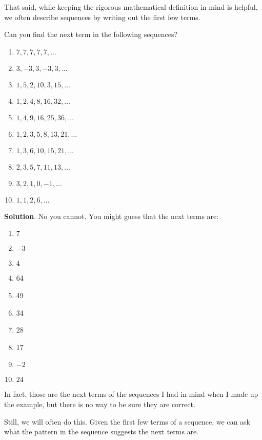 \documentclass[11pt,]{book}
\theoremstyle{ptxplainnotitle}
\theoremstyle{ptxplaintitle}
\theoremstyle{ptxdefinitionnotitle}
\theoremstyle{ptxdefinitiontitle}
\theoremstyle{ptxdefinitionnotitle}
\theoremstyle{ptxdefinitiontitle}
\theoremstyle{ptxdefinitionnotitle}
\theoremstyle{ptxdefinitiontitle}
\theoremstyle{ptxdefinitiontitlenonumber}
\theoremstyle{ptxdefinitiontitlenonumber}
\numberwithin{equation}{chapter}
\begin{document}
\par
\hypertarget{p-27}{}%
That said, while keeping the rigorous mathematical definition in mind is helpful, we often describe sequences by writing out the first few terms.%
\begin{example}\label{example-1}
\hypertarget{p-28}{}%
Can you find the next term in the following sequences?%
\par
\hypertarget{p-29}{}%
\leavevmode%
\begin{enumerate}
\item\hypertarget{li-4}{}\(7,7,7,7,7, \ldots\)%
\item\hypertarget{li-5}{}\(3, -3, 3, -3, 3, \ldots\)%
\item\hypertarget{li-6}{}\(1, 5, 2, 10, 3, 15, \ldots\)%
\item\hypertarget{li-7}{}\(1, 2, 4, 8, 16, 32, \ldots\)%
\item\hypertarget{li-8}{}\(1, 4, 9, 16, 25, 36, \ldots\)%
\item\hypertarget{li-9}{}\(1, 2, 3, 5, 8, 13, 21, \ldots\)%
\item\hypertarget{li-10}{}\(1, 3, 6, 10, 15, 21, \ldots\)%
\item\hypertarget{li-11}{}\(2, 3, 5, 7, 11, 13, \ldots\)%
\item\hypertarget{li-12}{}\(3, 2, 1, 0, -1, \ldots\)%
\item\hypertarget{li-13}{}\(1, 1, 2, 6, \ldots\)%
\end{enumerate}
%
\par\smallskip%
\noindent\textbf{Solution}.\hypertarget{solution-1}{}\quad%
\hypertarget{p-30}{}%
No you cannot. You might guess that the next terms are:%
\par
\hypertarget{p-31}{}%
\leavevmode%
\begin{enumerate}
\item\hypertarget{li-14}{}\(7\)%
\item\hypertarget{li-15}{}\(-3\)%
\item\hypertarget{li-16}{}\(4\)%
\item\hypertarget{li-17}{}\hypertarget{p-32}{}%
64%
\item\hypertarget{li-18}{}\hypertarget{p-33}{}%
49%
\item\hypertarget{li-19}{}\hypertarget{p-34}{}%
34%
\item\hypertarget{li-20}{}\hypertarget{p-35}{}%
28%
\item\hypertarget{li-21}{}\hypertarget{p-36}{}%
17%
\item\hypertarget{li-22}{}\(-2\)%
\item\hypertarget{li-23}{}\(24\)%
\end{enumerate}
%
\par
\hypertarget{p-37}{}%
In fact, those are the next terms of the sequences I had in mind when I made up the example, but there is no way to be sure they are correct.%
\par
\hypertarget{p-38}{}%
Still, we will often do this. Given the first few terms of a sequence, we can ask what the pattern in the sequence suggests the next terms are.%
\end{example}
\end{document}
